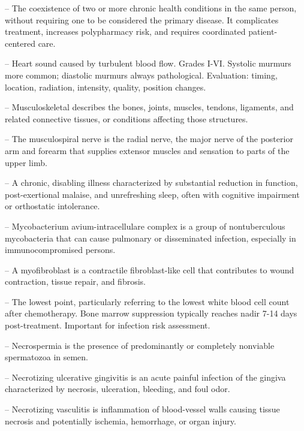 -- The coexistence of two or more chronic health conditions in the same person, without requiring one to be considered the primary disease. It complicates treatment, increases polypharmacy risk, and requires coordinated patient-centered care.

-- Heart sound caused by turbulent blood flow. Grades I-VI. Systolic murmurs more common; diastolic murmurs always pathological. Evaluation: timing, location, radiation, intensity, quality, position changes.

-- Musculoskeletal describes the bones, joints, muscles, tendons, ligaments, and related connective tissues, or conditions affecting those structures.

-- The musculospiral nerve is the radial nerve, the major nerve of the posterior arm and forearm that supplies extensor muscles and sensation to parts of the upper limb.

-- A chronic, disabling illness characterized by substantial reduction in function, post-exertional malaise, and unrefreshing sleep, often with cognitive impairment or orthostatic intolerance.

-- Mycobacterium avium-intracellulare complex is a group of nontuberculous mycobacteria that can cause pulmonary or disseminated infection, especially in immunocompromised persons.

-- A myofibroblast is a contractile fibroblast-like cell that contributes to wound contraction, tissue repair, and fibrosis.

-- The lowest point, particularly referring to the lowest white blood cell count after chemotherapy. Bone marrow suppression typically reaches nadir 7-14 days post-treatment. Important for infection risk assessment.

-- Necrospermia is the presence of predominantly or completely nonviable spermatozoa in semen.

-- Necrotizing ulcerative gingivitis is an acute painful infection of the gingiva characterized by necrosis, ulceration, bleeding, and foul odor.

-- Necrotizing vasculitis is inflammation of blood-vessel walls causing tissue necrosis and potentially ischemia, hemorrhage, or organ injury.

